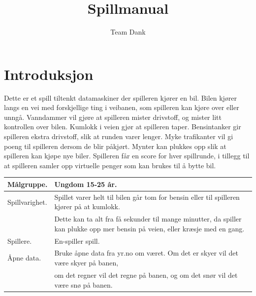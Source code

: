 \documentclass[paper=a4]{article}
\title{Spillmanual}
\author{Team Dank}
\begin{document}
\maketitle

\section{Introduksjon}
Dette er et spill tiltenkt datamaskiner der spilleren kjører en bil.
Bilen kjører langs en vei med forskjellige ting i veibanen, som spilleren kan kjøre over eller unngå.
Vanndammer vil gjøre at spilleren mister drivstoff, og mister litt kontrollen over bilen.
Kumlokk i veien gjør at spilleren taper.
Bensintanker gir spilleren ekstra drivstoff, slik at runden varer lenger.
Myke trafikanter vil gi poeng til spilleren dersom de blir påkjørt.
Mynter kan plukkes opp slik at spilleren kan kjøpe nye biler.
Spilleren får en score for hver spillrunde, i tillegg til at spilleren samler opp virtuelle penger som kan brukes til å bytte bil.
\begin{center}
\begin{tabular}{ | m{5cm} | m{8cm} | }
\hline
Målgruppe. & Ungdom 15-25 år. \\ \hline
Spillvarighet. & Spillet varer helt til bilen går tom for bensin eller til spilleren kjører på at kumlokk.\\&
Dette kan ta alt fra få sekunder til mange minutter, da spiller kan plukke opp mer bensin på veien, eller kræsje med en gang.\\ \hline
Spillere. & En-spiller spill. \\ \hline
Åpne data. & Bruke åpne data fra yr.no om været. Om det er skyer vil det være skyer på banen,\\&
om det regner vil det regne på banen, og om det snør vil det være snø på banen.\\ \hline
\end{tabular}
\end{center}
\end{document}
